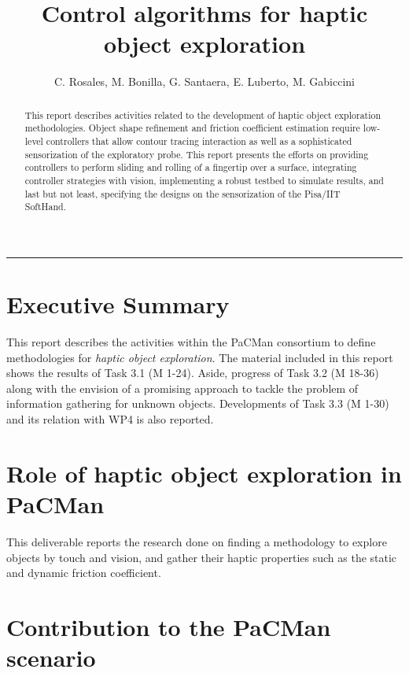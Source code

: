 \documentclass[a4paper,11pt,pdf]{pacmanreport}
\title{Control algorithms for haptic object exploration}
\author{C. Rosales, M. Bonilla, G. Santaera, E. Luberto, M. Gabiccini}
\begin{document}
\maketitle

\begin{abstract}
\noindent This report describes activities related to the development of haptic object exploration methodologies. Object shape refinement and friction coefficient estimation require low-level controllers that allow contour tracing interaction as well as a sophisticated sensorization of the exploratory probe. This report presents the efforts on providing controllers to perform sliding and rolling of a fingertip over a surface, integrating controller strategies with vision, implementing a robust testbed to simulate results, and last but not least, specifying the designs on the sensorization of the Pisa/IIT SoftHand.
\end{abstract}

\vspace{.2em}
\hrule

\footnotesize

\tableofcontents

\normalsize

\newpage

\section*{Executive Summary}
This report describes the activities within the PaCMan consortium to define methodologies for \emph{haptic object exploration}. The material included in this report shows the results of Task 3.1 (M 1-24). Aside, progress of Task 3.2 (M 18-36) along with the envision of a promising approach to tackle the problem of information gathering for unknown objects. Developments of Task 3.3 (M 1-30) and its relation with WP4 is also reported.

\section*{Role of haptic object exploration in PaCMan}

This deliverable reports the research done on finding a methodology to explore objects by touch and vision, and gather their haptic properties such as the static and dynamic friction coefficient.

\section*{Contribution to the PaCMan scenario}
\end{document}
